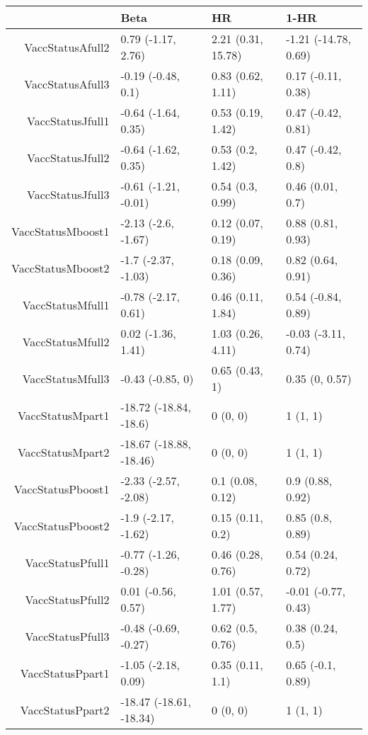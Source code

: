 \begin{table}[ht]
\centering
\begin{tabular}{rlll}
  \hline
 & Beta & HR & 1-HR \\ 
  \hline
VaccStatusAfull2 & 0.79 (-1.17, 2.76) & 2.21 (0.31, 15.78) & -1.21 (-14.78, 0.69) \\ 
  VaccStatusAfull3 & -0.19 (-0.48, 0.1) & 0.83 (0.62, 1.11) & 0.17 (-0.11, 0.38) \\ 
  VaccStatusJfull1 & -0.64 (-1.64, 0.35) & 0.53 (0.19, 1.42) & 0.47 (-0.42, 0.81) \\ 
  VaccStatusJfull2 & -0.64 (-1.62, 0.35) & 0.53 (0.2, 1.42) & 0.47 (-0.42, 0.8) \\ 
  VaccStatusJfull3 & -0.61 (-1.21, -0.01) & 0.54 (0.3, 0.99) & 0.46 (0.01, 0.7) \\ 
  VaccStatusMboost1 & -2.13 (-2.6, -1.67) & 0.12 (0.07, 0.19) & 0.88 (0.81, 0.93) \\ 
  VaccStatusMboost2 & -1.7 (-2.37, -1.03) & 0.18 (0.09, 0.36) & 0.82 (0.64, 0.91) \\ 
  VaccStatusMfull1 & -0.78 (-2.17, 0.61) & 0.46 (0.11, 1.84) & 0.54 (-0.84, 0.89) \\ 
  VaccStatusMfull2 & 0.02 (-1.36, 1.41) & 1.03 (0.26, 4.11) & -0.03 (-3.11, 0.74) \\ 
  VaccStatusMfull3 & -0.43 (-0.85, 0) & 0.65 (0.43, 1) & 0.35 (0, 0.57) \\ 
  VaccStatusMpart1 & -18.72 (-18.84, -18.6) & 0 (0, 0) & 1 (1, 1) \\ 
  VaccStatusMpart2 & -18.67 (-18.88, -18.46) & 0 (0, 0) & 1 (1, 1) \\ 
  VaccStatusPboost1 & -2.33 (-2.57, -2.08) & 0.1 (0.08, 0.12) & 0.9 (0.88, 0.92) \\ 
  VaccStatusPboost2 & -1.9 (-2.17, -1.62) & 0.15 (0.11, 0.2) & 0.85 (0.8, 0.89) \\ 
  VaccStatusPfull1 & -0.77 (-1.26, -0.28) & 0.46 (0.28, 0.76) & 0.54 (0.24, 0.72) \\ 
  VaccStatusPfull2 & 0.01 (-0.56, 0.57) & 1.01 (0.57, 1.77) & -0.01 (-0.77, 0.43) \\ 
  VaccStatusPfull3 & -0.48 (-0.69, -0.27) & 0.62 (0.5, 0.76) & 0.38 (0.24, 0.5) \\ 
  VaccStatusPpart1 & -1.05 (-2.18, 0.09) & 0.35 (0.11, 1.1) & 0.65 (-0.1, 0.89) \\ 
  VaccStatusPpart2 & -18.47 (-18.61, -18.34) & 0 (0, 0) & 1 (1, 1) \\ 

\end{tabular}
\end{table}
